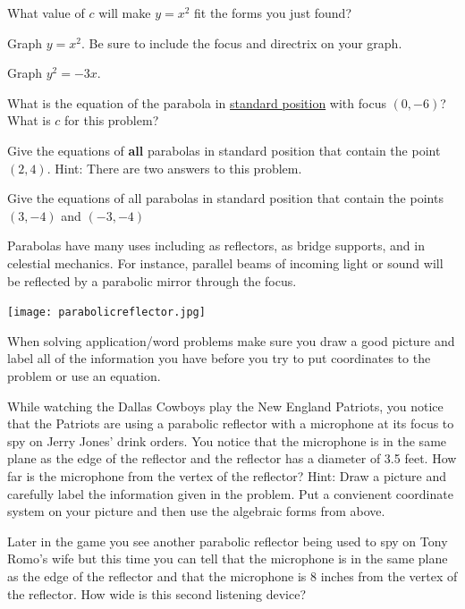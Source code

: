 \bq
\be
\item What value of $c$ will make $y=x^2$ fit the forms you just found?
\item Graph $y=x^2$. Be sure to include the focus and directrix on your graph.
\ee
\eq

\question Graph $y^2=-3x$.

\question What is the equation of the parabola in \underline{standard position} with focus $(0,-6)$? What is $c$ for this problem?

\question Give the equations of \textbf{all} parabolas in standard position that contain the point $(2,4)$. Hint: There are two answers to this problem.

\question Give the equations of all parabolas in standard position that contain the points $(3,-4)$ and $(-3,-4)$

\begin{info} Parabolas have many uses including as reflectors, as bridge supports, and in celestial mechanics. For instance, parallel beams of incoming light or sound will be reflected by a parabolic mirror through the focus.

\begin{center} \texttt{[image: parabolicreflector.jpg]} \end{center}

When solving application/word problems make sure you draw a good picture and label all of the information you have before you try to put coordinates to the problem or use an equation.
\end{info}

\question While watching the Dallas Cowboys play the New England Patriots, you notice that the Patriots are using a parabolic reflector with a microphone at its focus to spy on Jerry Jones' drink orders. You notice that the microphone is in the same plane as the edge of the reflector and the reflector has a diameter of 3.5 feet. How far is the microphone from the vertex of the reflector? Hint: Draw a picture and carefully label the information given in the problem. Put a convienent coordinate system on your picture and then use the algebraic forms from above.

\question Later in the game you see another parabolic reflector being used to spy on Tony Romo's wife but this time you can tell that the microphone is in the same plane as the edge of the reflector and that the microphone is 8 inches from the vertex of the reflector. How wide is this second listening device?

